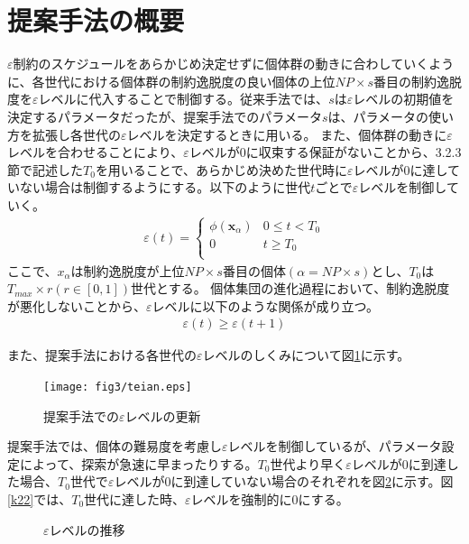 \documentclass[a4paper,12pt]{jsreport}
\begin{document}
\section{提案手法の概要}
$\varepsilon$制約のスケジュールをあらかじめ決定せずに個体群の動きに合わしていくように、各世代における個体群の制約逸脱度の良い個体の上位$NP×s$番目の制約逸脱度を$\varepsilon$レベルに代入することで制御する。従来手法では、$s$は$\varepsilon$レベルの初期値を決定するパラメータだったが、提案手法でのパラメータ$s$は、パラメータの使い方を拡張し各世代の$\varepsilon$レベルを決定するときに用いる。
また、個体群の動きに$\varepsilon$レベルを合わせることにより、$\varepsilon$レベルが0に収束する保証がないことから、3.2.3節で記述した${T}_0$を用いることで、あらかじめ決めた世代時に$\varepsilon$レベルが0に達していない場合は制御するようにする。以下のように世代$t$ごとで$\varepsilon$レベルを制御していく。
\begin{eqnarray}
\varepsilon(t)=
\left\{
\begin{array}{cc}
    {\phi({\bm x}_\alpha)} & \mbox{$0\leq t<{T}_0$} \\
    {0} & \mbox{$t\geq{T}_0$}\\
\end{array}
\right.
\label{提案手法}
\end{eqnarray}
ここで、${x}_\alpha$は制約逸脱度が上位$NP×s$番目の個体$(\alpha=NP \times s)$とし、${T}_0$は${T}_{max}\times{r}(r\in[0,1])$世代とする。
個体集団の進化過程において、制約逸脱度が悪化しないことから、$\varepsilon$レベルに以下のような関係が成り立つ。
\begin{eqnarray}
\varepsilon(t) \geq \varepsilon(t+1)
\end{eqnarray}

また、提案手法における各世代の$\varepsilon$レベルのしくみについて図\ref{fig:teian}に示す。

\begin{figure}[htbp]
  \centering
  \texttt{[image: fig3/teian.eps]}
  \caption{提案手法での$\varepsilon$レベルの更新}
  \label{fig:teian}
\end{figure}

\newpage

提案手法では、個体の難易度を考慮し$\varepsilon$レベルを制御しているが、パラメータ設定によって、探索が急速に早まったりする。$T_{0}$世代より早く$\varepsilon$レベルが0に到達した場合、$T_{0}$世代で$\varepsilon$レベルが0に到達していない場合のそれぞれを図\ref{fig:nonipusilon}に示す。図\ref{k22}では、$T_{0}$世代に達した時、$\varepsilon$レベルを強制的に0にする。

\begin{figure}[htbp]
  \begin{center}
  \hfill
  \end{center}

  \caption{$\varepsilon$レベルの推移}
  \label{fig:nonipusilon}
\end{figure}
\end{document}
